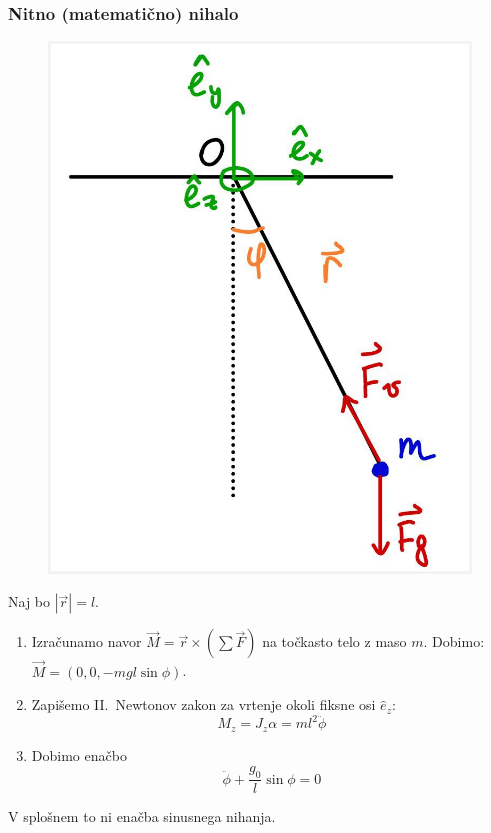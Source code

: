 \subsubsection*{Nitno (matematično) nihalo}
\begin{figure}
    \includegraphics[width=0.9\linewidth]{img/01_004.jpg} 
\end{figure}
Naj bo \(|\vec{r}| = l\). 
\begin{enumerate}
    \item Izračunamo navor \(\vec{M} = \vec{r} \times (\sum \vec{F})\) na točkasto telo z maso \(m\). Dobimo: \(\vec{M} = (0, 0, -mgl \sin \phi)\).
    \item Zapišemo II.\ Newtonov zakon za vrtenje okoli fiksne osi \(\hat{e}_z\): 
    \[M_z = J_z  \alpha = ml^2  \ddot{\phi}\]
    \item Dobimo enačbo \[\boxed{\ddot{\phi} + \frac{g_0}{l} \sin \phi = 0}\]
\end{enumerate}

\begin{opomba}
    V splošnem to ni enačba sinusnega nihanja. 
\end{opomba}

